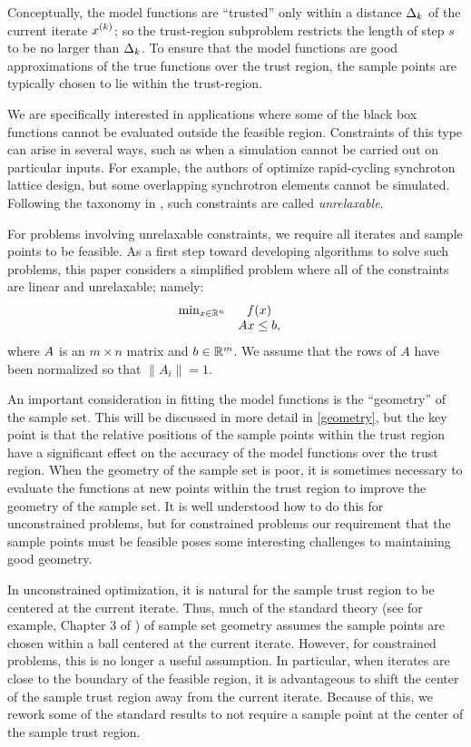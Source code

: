 \documentclass{article}
\begin{document}
Conceptually, the model functions are ``trusted'' only within a distance $ \Delta_k $ of the current iterate $x^{(k)}$; 
so the trust-region subproblem restricts the length of step $s$ to be no larger than $\Delta_k$.
To ensure that the model functions are good approximations of the true functions over the trust region, 
the sample points are typically chosen to lie within the trust-region.

We are specifically interested in applications where some of the black box functions cannot be evaluated outside the feasible region.  Constraints of this type can arise in several ways, such as when a simulation cannot be carried out on particular inputs.
For example, the authors of \cite{Padidar2021} optimize rapid-cycling synchroton lattice design,
but some overlapping synchrotron elements cannot be simulated.
Following the taxonomy in \cite{ledigabel2015taxonomy},  such constraints are called {\em unrelaxable}.

For problems involving unrelaxable constraints,  we require all iterates and sample points to be feasible.
As a first step toward developing algorithms to solve such problems, this paper considers a simplified problem where all of the constraints are linear and unrelaxable; namely:
\begin{align}
\begin{array}{ccl} \min_{x \in \mathbb R^n} & f(x) \\
& {A} x \le {b}, & 
\end{array}
\label{linear_dfo_problem}
\end{align}
where ${A}$ is an $m \times n$ matrix and ${b} \in \mathbb R^m$.
We assume that the rows of $A$ have been normalized so that $\|A_i\| = 1$.


An important consideration in fitting the model functions is the ``geometry'' of the sample set.
This will be discussed in more detail in \cref{geometry}, but the key point is that the relative positions of the sample points within the trust region have a significant effect on the accuracy of the model functions over the trust region.
When the geometry of the sample set is poor, it is sometimes necessary to evaluate the functions at new points within the trust region to improve the geometry of the sample set.
It is well understood how to do this for unconstrained problems, but for constrained problems
our requirement that the sample points must be feasible poses some interesting challenges to maintaining good geometry.   

In unconstrained optimization, it is natural for the sample trust region to be centered at the current iterate.
Thus, much of the standard theory (see for example, Chapter 3 of \cite{introduction_book})
of sample set geometry assumes the sample points are chosen within a ball centered at the current iterate.
However, for constrained problems,  this is no longer a useful assumption.
In particular, when iterates are close to the boundary of the feasible region, it is advantageous to shift the center of the sample trust region away from the current iterate.
Because of this, we rework some of the standard results to not require a sample point at the center of the sample trust region.
\end{document}
